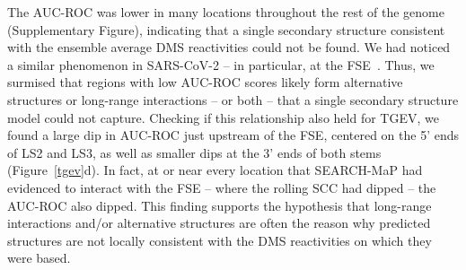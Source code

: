 \documentclass[main.tex]{subfiles}
\begin{document}
The AUC-ROC was lower in many locations throughout the rest of the genome (Supplementary Figure), indicating that a single secondary structure consistent with the ensemble average DMS reactivities could not be found.
We had noticed a similar phenomenon in SARS-CoV-2 -- in particular, at the FSE~\cite{Lan2022}.
Thus, we surmised that regions with low AUC-ROC scores likely form alternative structures or long-range interactions -- or both -- that a single secondary structure model could not capture.
Checking if this relationship also held for TGEV, we found a large dip in AUC-ROC just upstream of the FSE, centered on the 5' ends of LS2 and LS3, as well as smaller dips at the 3' ends of both stems (Figure~\ref{tgev}d).
In fact, at or near every location that SEARCH-MaP had evidenced to interact with the FSE -- where the rolling SCC had dipped -- the AUC-ROC also dipped.
This finding supports the hypothesis that long-range interactions and/or alternative structures are often the reason why predicted structures are not locally consistent with the DMS reactivities on which they were based.
\end{document}
